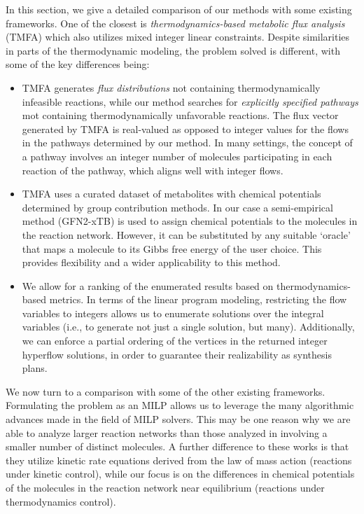 In this section, we give a detailed comparison of our methods with some existing frameworks.
One of the closest is \emph{thermodynamics-based metabolic flux analysis} (TMFA) \cite{hatz_thermo_flow} which also utilizes mixed integer linear constraints.
Despite similarities in parts of the thermodynamic modeling, the problem solved is different, with some of the key differences being:
\begin{itemize}
    \item TMFA generates \emph{flux distributions} not containing thermodynamically infeasible reactions, while our method searches for \emph{explicitly specified pathways} mot containing thermodynamically unfavorable reactions. The flux vector generated by TMFA is real-valued as opposed to integer values for the flows in the pathways determined by our method. In many settings, the concept of a pathway involves an integer number of molecules participating in each reaction of the pathway, which aligns well with integer flows.
    \item TMFA uses a curated dataset of metabolites with chemical potentials determined by group contribution methods. In our case a semi-empirical method (GFN2-xTB) is used to assign chemical potentials to the molecules in the reaction network. However, it can be substituted by any suitable `oracle' that maps a molecule to its Gibbs free energy of the user choice. This provides flexibility and a wider applicability to this method.
    \item  We allow for a ranking of the enumerated results based on thermodynamics-based metrics. In terms of the linear program modeling, restricting the flow variables to integers allows us to enumerate solutions over the integral variables (i.e., to generate not just a single solution, but many).
    Additionally, we can enforce a partial ordering of the vertices in the returned integer hyperflow solutions, in order to guarantee their realizability as synthesis plans.
\end{itemize}

We now turn to a comparison with some of the other existing frameworks.
Formulating the problem as an MILP allows us to leverage the many algorithmic advances made in the field of MILP solvers.
This may be one reason why we are able to analyze larger reaction networks than those analyzed in \cite{miangolarra_non_ideal_CRN, seifert_thermodynamics_CRN_JCP, nicolis_thermodynamics_CRN} involving a smaller number of distinct molecules.
A further difference to these works is that they utilize kinetic rate equations derived from the law of mass action (reactions under kinetic control),
while our focus is on the differences in chemical potentials of the molecules in the reaction network near equilibrium (reactions under thermodynamics control).


